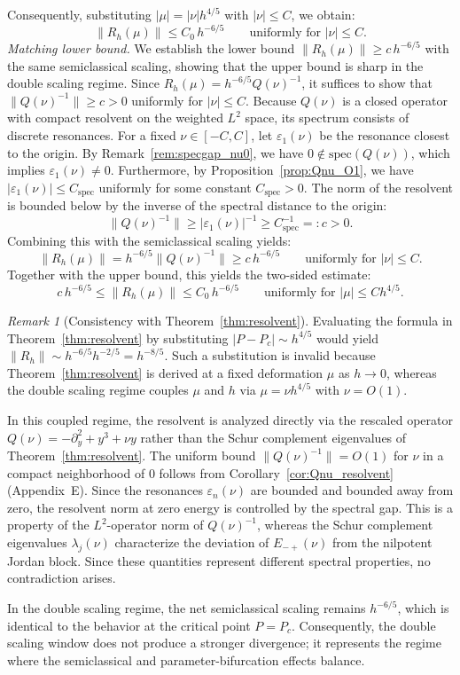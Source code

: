 \documentclass[12pt,a4paper]{amsart}
\theoremstyle{remark}
\newtheorem{remark}[theorem]{Remark}
\begin{document}
Consequently, substituting $|\mu| = |\nu| h^{4/5}$ with $|\nu| \leq C$, we obtain:
\[
  \|R_h(\mu)\| \leq C_0\, h^{-6/5}
  \qquad \text{uniformly for } |\nu| \leq C.
\]
\emph{Matching lower bound.}
We establish the lower bound $\|R_h(\mu)\| \geq c\,h^{-6/5}$ with the same semiclassical
scaling, showing that the upper bound is sharp in the double scaling regime.
Since $R_h(\mu) = h^{-6/5} Q(\nu)^{-1}$, it suffices to show that
$\|Q(\nu)^{-1}\| \geq c > 0$ uniformly for $|\nu| \leq C$.
Because $Q(\nu)$ is a closed operator with compact resolvent on the weighted $L^2$ space,
its spectrum consists of discrete resonances. For a fixed $\nu \in [-C,C]$, let
$\varepsilon_1(\nu)$ be the resonance closest to the origin. By Remark~\ref{rem:specgap_nu0},
we have $0 \notin \mathrm{spec}(Q(\nu))$, which implies $\varepsilon_1(\nu) \neq 0$.
Furthermore, by Proposition~\ref{prop:Qnu_O1}, we have $|\varepsilon_1(\nu)| \leq C_{\mathrm{spec}}$
uniformly for some constant $C_{\mathrm{spec}} > 0$.
The norm of the resolvent is bounded below by the inverse of the spectral distance to the origin:
\[
  \|Q(\nu)^{-1}\| \geq |\varepsilon_1(\nu)|^{-1} \geq C_{\mathrm{spec}}^{-1} =: c > 0.
\]
Combining this with the semiclassical scaling yields:
\[
  \|R_h(\mu)\| = h^{-6/5}\|Q(\nu)^{-1}\| \geq c\,h^{-6/5}
  \qquad \text{uniformly for } |\nu| \leq C.
\]
Together with the upper bound, this yields the two-sided estimate:
\[
  c\,h^{-6/5} \leq \|R_h(\mu)\| \leq C_0\,h^{-6/5}
  \qquad \text{uniformly for } |\mu| \leq C h^{4/5}.
\]
\begin{remark}[Consistency with Theorem~\ref{thm:resolvent}]
\label{rem:consistency}
Evaluating the formula in Theorem~\ref{thm:resolvent} by substituting $|P - P_c| \sim h^{4/5}$
would yield $\|R_h\| \sim h^{-6/5} h^{-2/5} = h^{-8/5}$. Such a
substitution is invalid because Theorem~\ref{thm:resolvent} is derived at a fixed deformation $\mu$
as $h \to 0$, whereas the double scaling regime couples $\mu$ and $h$
via $\mu = \nu h^{4/5}$ with $\nu = O(1)$.

In this coupled regime, the resolvent is analyzed directly via the rescaled operator
$Q(\nu) = -\partial_y^2 + y^3 + \nu y$ rather than the Schur complement eigenvalues
of Theorem~\ref{thm:resolvent}.
The uniform bound $\|Q(\nu)^{-1}\| = O(1)$ for $\nu$ in a compact neighborhood
of $0$ follows from Corollary~\ref{cor:Qnu_resolvent} (Appendix~E).
Since the resonances $\varepsilon_n(\nu)$ are bounded and bounded away from zero,
the resolvent norm at zero energy is controlled by the spectral gap.
This is a property of the $L^2$-operator norm of $Q(\nu)^{-1}$, whereas the Schur
complement eigenvalues $\lambda_j(\nu)$ characterize the deviation of $E_{-+}(\nu)$
from the nilpotent Jordan block. Since these quantities represent different spectral
properties, no contradiction arises.

In the double scaling regime, the net semiclassical scaling remains $h^{-6/5}$,
which is identical to the behavior at the critical point $P = P_c$.
Consequently, the double scaling window does not produce a stronger divergence;
it represents the regime where the semiclassical and parameter-bifurcation effects balance.
\end{remark}
\end{document}
